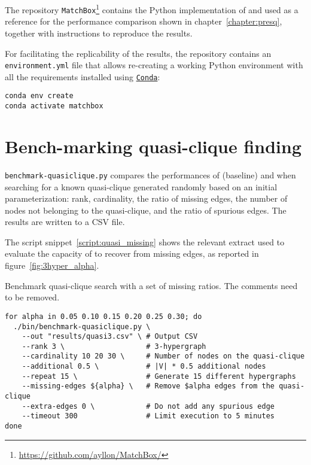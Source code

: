 The repository \texttt{MatchBox}\footnote{\url{https://github.com/ayllon/MatchBox/}}
contains the Python implementation of \PresQ and \Find used as a reference for the
performance comparison shown in chapter~\ref{chapter:presq}, together with instructions
to reproduce the results.

For facilitating the replicability of the results, the repository contains an \linebreak
\texttt{environment.yml} file that allows re-creating a working Python environment
with all the requirements installed using \href{https://docs.conda.io/en/latest/}{\texttt{Conda}}:

\begin{verbatim}
conda env create
conda activate matchbox
\end{verbatim}

\section{Bench-marking quasi-clique finding}

\texttt{benchmark-quasiclique.py} compares the performances of \Find (baseline) and \PresQ
when searching for a known quasi-clique generated randomly based on an initial parameterization:
rank, cardinality, the ratio of missing edges, the number of nodes not belonging to the
quasi-clique, and the ratio of spurious edges. The results are written to a \gls{CSV} file.

The script snippet~\ref{script:quasi_missing} shows the relevant extract used to evaluate
the capacity of \PresQ to recover from missing edges, as reported in figure~\ref{fig:3hyper_alpha}.

\begin{code}
\caption{Benchmark quasi-clique search with a set of missing ratios. The comments need to be removed.}\label{script:quasi_missing}
\begin{verbatim}
for alpha in 0.05 0.10 0.15 0.20 0.25 0.30; do
  ./bin/benchmark-quasiclique.py \
    --out "results/quasi3.csv" \ # Output CSV
    --rank 3 \                   # 3-hypergraph
    --cardinality 10 20 30 \     # Number of nodes on the quasi-clique
    --additional 0.5 \           # |V| * 0.5 additional nodes
    --repeat 15 \                # Generate 15 different hypergraphs
    --missing-edges ${alpha} \   # Remove $alpha edges from the quasi-clique
    --extra-edges 0 \            # Do not add any spurious edge
    --timeout 300                # Limit execution to 5 minutes
done
\end{verbatim}
\end{code}

